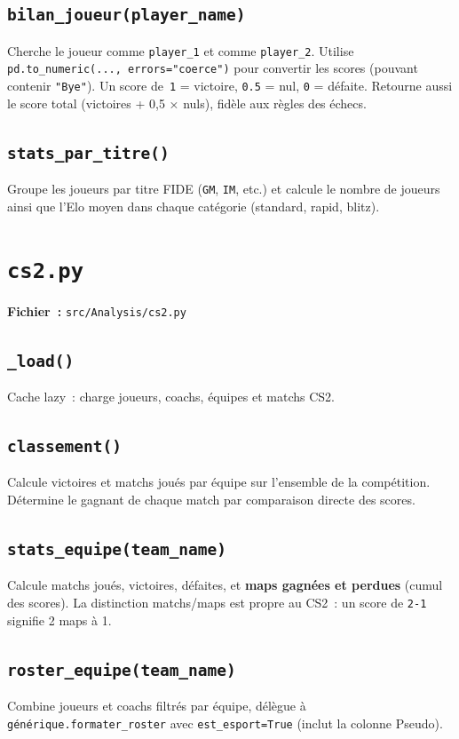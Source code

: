 \documentclass[12pt,a4paper]{article}
\begin{document}
\subsection{\texttt{bilan\_joueur(player\_name)}}
Cherche le joueur comme \texttt{player\_1} et comme \texttt{player\_2}.
Utilise \texttt{pd.to\_numeric(..., errors="coerce")} pour convertir les
scores (pouvant contenir \texttt{"Bye"}). Un score de~\texttt{1} = victoire,
\texttt{0.5} = nul, \texttt{0} = défaite. Retourne aussi le score total
(victoires + 0,5 × nuls), fidèle aux règles des échecs.

\subsection{\texttt{stats\_par\_titre()}}
Groupe les joueurs par titre FIDE (\texttt{GM}, \texttt{IM}, etc.) et calcule
le nombre de joueurs ainsi que l'Elo moyen dans chaque catégorie
(standard, rapid, blitz).

\section{\texttt{cs2.py}}

\textbf{Fichier~:} \texttt{src/Analysis/cs2.py}

\subsection{\texttt{\_load()}}
Cache lazy~: charge joueurs, coachs, équipes et matchs CS2.

\subsection{\texttt{classement()}}
Calcule victoires et matchs joués par équipe sur l'ensemble de la compétition.
Détermine le gagnant de chaque match par comparaison directe des scores.

\subsection{\texttt{stats\_equipe(team\_name)}}
Calcule matchs joués, victoires, défaites, et \textbf{maps gagnées et perdues}
(cumul des scores). La distinction matchs/maps est propre au CS2~: un score
de \texttt{2-1} signifie 2 maps à 1.

\subsection{\texttt{roster\_equipe(team\_name)}}
Combine joueurs et coachs filtrés par équipe, délègue à
\texttt{générique.formater\_roster} avec \texttt{est\_esport=True}
(inclut la colonne Pseudo).
\end{document}
